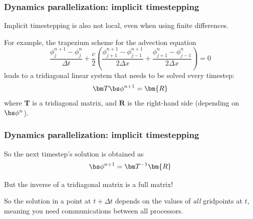 \documentclass[aspectratio=43,9pt]{beamer}
\begin{document}
\begin{frame}
	\frametitle{Dynamics parallelization: implicit timestepping}
	\begin{myitemize}{2ex}
		\item Implicit timestepping is also not local, even when using finite differences.
		\item For example, the trapezium scheme for the advection equation
			\begin{equation*}
				\frac{\phi_{j}^{n+1}-\phi_{j}^n}{\Delta t}+\frac{c}{2}\left(\frac{\phi^{n+1}_{j+1}-\phi^{n+1}_{j-1}}{2\Delta x}+\frac{\phi^{n}_{j+1}-\phi^{n}_{j-1}}{2\Delta x}\right)=0
			\end{equation*}
			leads to a tridiagonal linear system that needs to be solved every timestep:
			\begin{equation*}
				\bm T\bs\phi^{n+1}=\bm{R}
			\end{equation*}
			where $\bm T$ is a tridiagonal matrix, and $\bm R$ is the right-hand side (depending on $\bs\phi^n$). 
	\end{myitemize}
\end{frame}
%
%
\begin{frame}
	\frametitle{Dynamics parallelization: implicit timestepping}
	\begin{myitemize}{2ex}
		\item
			So the next timestep's solution is obtained as
			\begin{equation*}	
				\bs\phi^{n+1}=\bm T^{-1}\bm{R}
			\end{equation*}
		\item But the inverse of a tridiagonal matrix is a full matrix!
		\item So the solution in a point at $t+\Delta t$ depends on the values of \emph{all} gridpoints at $t$, meaning you need communications between all processors.
	\end{myitemize}
\end{frame}
%
%
\end{document}
